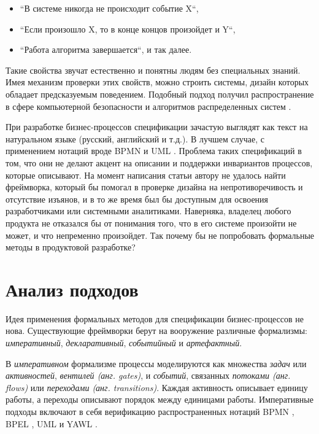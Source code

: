 \documentclass[14pt, openany]{book}
\begin{document}
\begin{itemize}
  \item ``В системе никогда не происходит событие X``,
  \item ``Если произошло X, то в конце концов произойдет и Y``, 
  \item ``Работа алгоритма завершается``, и так далее. 
\end{itemize}

Такие свойства звучат естественно и понятны людям без специальных знаний. Имея механизм проверки этих свойств, можно строить системы, дизайн которых обладает предсказуемым поведением. Подобный подход получил распространение в сфере компьютерной безопасности \cite{formalSecure} и алгоритмов распределенных систем \cite{formalAlg}. 

При разработке бизнес-процессов спецификации зачастую выглядят как текст на натуральном языке (русский, английский и т.д.). В лучшем случае, с применением нотаций вроде BPMN \cite{bpmn} и UML \cite{uml}. Проблема таких спецификаций в том, что они не делают акцент на описании и поддержки инвариантов процессов, которые описывают. На момент написания статьи автору не удалось найти фреймворка, который бы помогал в проверке дизайна на непротиворечивость и отсутствие изъянов, и в то же время был бы доступным для освоения разработчиками или системными аналитиками.
Наверняка, владелец любого продукта не отказался бы от понимания того, что в его системе произойти не может, и что непременно произойдет.
Так почему бы не попробовать формальные методы в продуктовой разработке?


\section{Анализ подходов}
Идея применения формальных методов для спецификации бизнес-процессов не нова. Существующие фреймворки берут на вооружение различные формализмы: \emph{императивный}, \emph{декларативный}, \emph{событийный} и \emph{артефактный}. 

В \emph{императивном} формализме процессы моделируются как множества \emph{задач} или \emph{активностей}, \emph{вентилей (анг. gates)}, и \emph{событий}, связанных \emph{потоками (анг. flows)} или \emph{переходами (анг. transitions)}. Каждая активность описывает единицу работы, а переходы описывают порядок между единицами работы. Императивные подходы включают в себя верификацию распространенных нотаций BPMN \cite{specBPMN}, BPEL \cite{specBPEL}, UML \cite{specUML} и YAWL \cite{specYAWL}. 
\end{document}

